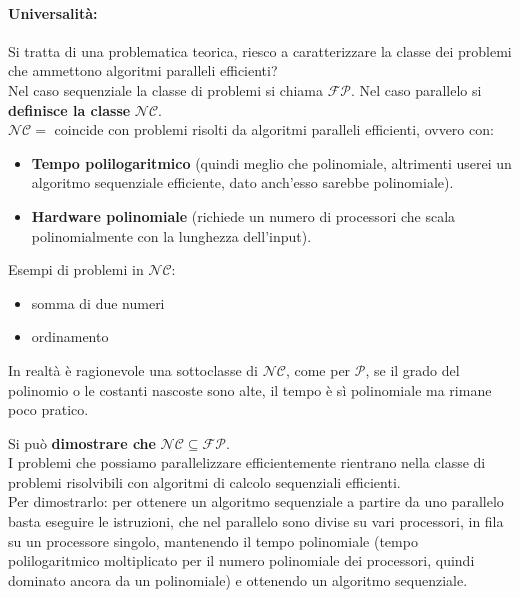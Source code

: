 \documentclass[11pt]{article}
\begin{document}
	\paragraph{Universalità:} Si tratta di una problematica teorica, riesco a caratterizzare la classe dei problemi che ammettono algoritmi paralleli efficienti?\\
	
	Nel caso sequenziale la classe di problemi si chiama $\mathcal{FP}$. Nel caso parallelo si \textbf{definisce la classe} $\mathcal{NC}$.\\
	
	$\mathcal{NC} = $ coincide con problemi risolti da algoritmi paralleli efficienti, ovvero con:
	\begin{itemize}
		\item \textbf{Tempo polilogaritmico} (quindi meglio che polinomiale, altrimenti userei un algoritmo sequenziale efficiente, dato anch'esso sarebbe polinomiale).\\
		\item \textbf{Hardware polinomiale} (richiede un numero di processori che scala polinomialmente con la lunghezza dell'input).\\
	\end{itemize}
	
	Esempi di problemi in $\mathcal{NC}$: 
	\begin{itemize}
		\item somma di due numeri
		\item ordinamento 
	\end{itemize}
	
	In realtà è ragionevole una sottoclasse di $\mathcal{NC}$, come per $\mathcal{P}$, se il grado del polinomio o le costanti nascoste sono alte, il tempo è sì polinomiale ma rimane poco pratico.\\
	
	\newpage
	
	Si può \textbf{dimostrare che} $\mathcal{NC} \subseteq \mathcal{FP}$.\\
	I problemi che possiamo parallelizzare efficientemente rientrano nella classe di problemi risolvibili con algoritmi di calcolo sequenziali efficienti.\\
	
	Per dimostrarlo: per ottenere un algoritmo sequenziale a partire da uno parallelo basta eseguire le istruzioni, che nel parallelo sono divise su vari processori, in fila su un processore singolo, mantenendo il tempo polinomiale (tempo polilogaritmico moltiplicato per il numero polinomiale dei processori, quindi dominato ancora da un polinomiale) e ottenendo un algoritmo sequenziale.\\
	
\end{document}
